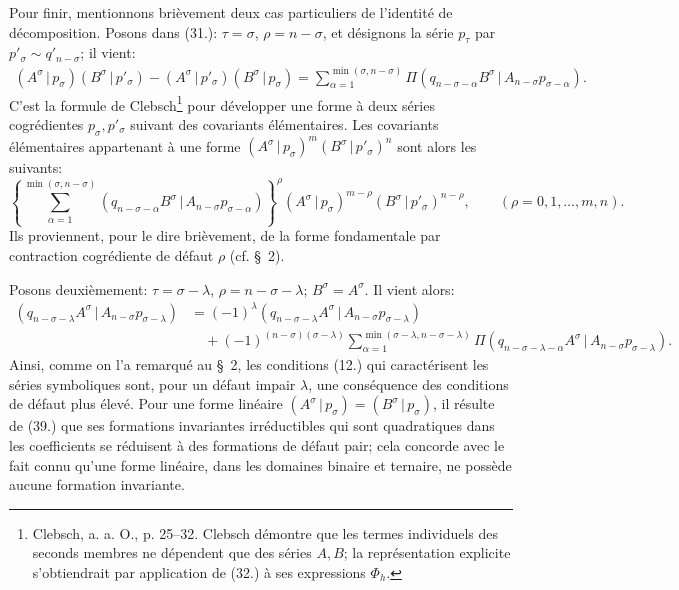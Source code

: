 \documentclass[11pt]{article}
\newcommand{\pair}[2]{(#1\,|\,#2)}
\begin{document}
Pour finir, mentionnons brièvement deux cas particuliers de l'identité de décomposition. Posons dans (31.): $\tau=\sigma$, $\rho=n-\sigma$, et désignons la série $p_\tau$ par $p'_\sigma\sim q'_{n-\sigma}$; il vient:
\begin{equation}
\begin{aligned}
\pair{A^\sigma}{p_\sigma}\pair{B^\sigma}{p'_\sigma}
-\pair{A^\sigma}{p'_\sigma}\pair{B^\sigma}{p_\sigma}
=\sum_{\alpha=1}^{\min(\sigma,n-\sigma)}
\Pi\pair{q_{n-\sigma-\alpha}B^\sigma}{A_{n-\sigma}p_{\sigma-\alpha}}.
\end{aligned}
\tag{37}
\end{equation}
C'est la formule de Clebsch\footnote{Clebsch, a. a. O., p. 25--32. Clebsch démontre que les termes individuels des seconds membres ne dépendent que des séries $A,B$; la représentation explicite s'obtiendrait par application de (32.) à ses expressions $\Phi_h$.} pour développer une forme à deux séries cogrédientes $p_\sigma,p'_\sigma$ suivant des covariants élémentaires. Les covariants élémentaires appartenant à une forme $\pair{A^\sigma}{p_\sigma}^m\pair{B^\sigma}{p'_\sigma}^n$ sont alors les suivants:
\begin{equation}
 \left\{\sum_{\alpha=1}^{\min(\sigma,n-\sigma)}
 \pair{q_{n-\sigma-\alpha}B^\sigma}{A_{n-\sigma}p_{\sigma-\alpha}}
 \right\}^{\rho}
 \pair{A^\sigma}{p_\sigma}^{m-\rho}\pair{B^\sigma}{p'_\sigma}^{n-\rho},
 \qquad (\rho=0,1,\ldots,m,n).
\tag{38}
\end{equation}
Ils proviennent, pour le dire brièvement, de la forme fondamentale par \og{} contraction cogrédiente de défaut $\rho$ \fg{} (cf. \S\ 2).

Posons deuxièmement: $\tau=\sigma-\lambda$, $\rho=n-\sigma-\lambda$; $B^\sigma=A^\sigma$. Il vient alors:
\begin{equation}
\begin{aligned}
\pair{q_{n-\sigma-\lambda}A^\sigma}{A_{n-\sigma}p_{\sigma-\lambda}}
&=(-1)^\lambda\pair{q_{n-\sigma-\lambda}A^\sigma}{A_{n-\sigma}p_{\sigma-\lambda}}\\
&\quad+(-1)^{(n-\sigma)(\sigma-\lambda)}
 \sum_{\alpha=1}^{\min(\sigma-\lambda,n-\sigma-\lambda)}
 \Pi\pair{q_{n-\sigma-\lambda-\alpha}A^\sigma}{A_{n-\sigma}p_{\sigma-\lambda}}.
\end{aligned}
\tag{39}
\end{equation}
Ainsi, comme on l'a remarqué au \S\ 2, les conditions (12.) qui caractérisent les séries symboliques sont, pour un défaut impair $\lambda$, une conséquence des conditions de défaut plus élevé. Pour une forme linéaire $\pair{A^\sigma}{p_\sigma}=\pair{B^\sigma}{p_\sigma}$, il résulte de (39.) que ses formations invariantes irréductibles qui sont quadratiques dans les coefficients se réduisent à des formations de défaut pair; cela concorde avec le fait connu qu'une forme linéaire, dans les domaines binaire et ternaire, ne possède aucune formation invariante.
\end{document}
